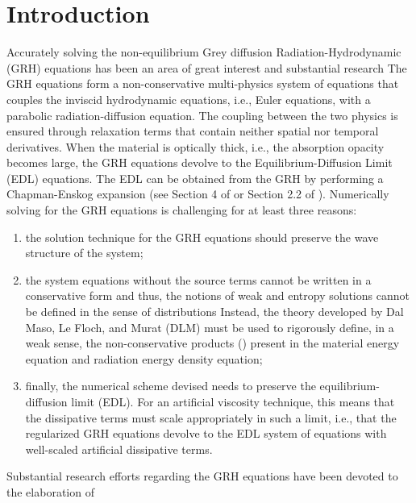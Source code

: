 \documentclass[times,doublespace]{fldauth}%
\begin{document}
\section{Introduction}
\label{sec:intro}
Accurately solving the non-equilibrium Grey diffusion Radiation-Hydrodynamic (GRH) equations 
has been an area of great interest and substantial research \cite{Balsara,LowrieMorelHittinger,EdwardsMorelLowrie}
The GRH equations form a non-conservative multi-physics system of equations that couples the inviscid 
hydrodynamic equations, i.e., Euler equations, with a parabolic radiation-diffusion equation. 
The coupling between the two physics is ensured through relaxation terms
that contain neither spatial nor temporal derivatives. When the material is optically thick, i.e., 
the absorption opacity becomes large, the GRH equations devolve to the Equilibrium-Diffusion Limit (EDL) 
equations. The EDL can be obtained from the GRH by performing a Chapman-Enskog expansion 
(see Section 4 of \cite{LowrieMorel} or Section 2.2 of \cite{our_jcp_radhy_paper}).
Numerically solving for the GRH equations is challenging for at least three reasons: 
\begin{enumerate}
\item
the solution technique for the GRH equations should preserve the wave structure of the system; 
\item
the system equations without the source terms cannot be written in a conservative form and thus, the notions of weak and entropy 
solutions cannot be defined in the sense of distributions \cite{dlm, lefloch_1988, lefloch_1989, lefloch_liu_1993, bianchini_bressan_2005} 
Instead, the theory developed by Dal Maso, Le Floch, and Murat (DLM) must be used to
rigorously define, in a weak sense, the non-conservative products (\cite{dlm}) present in the material energy equation 
and radiation energy density equation;
\item
finally, the numerical scheme devised needs to preserve the equilibrium-diffusion limit (EDL). For an artificial viscosity technique,
this means that the dissipative terms must scale appropriately in such a limit, i.e., that the regularized GRH equations 
devolve to the EDL system of equations with well-scaled artificial dissipative terms.
\end{enumerate}
%
Substantial research efforts regarding the GRH equations have been devoted to the elaboration of 
\end{document}
